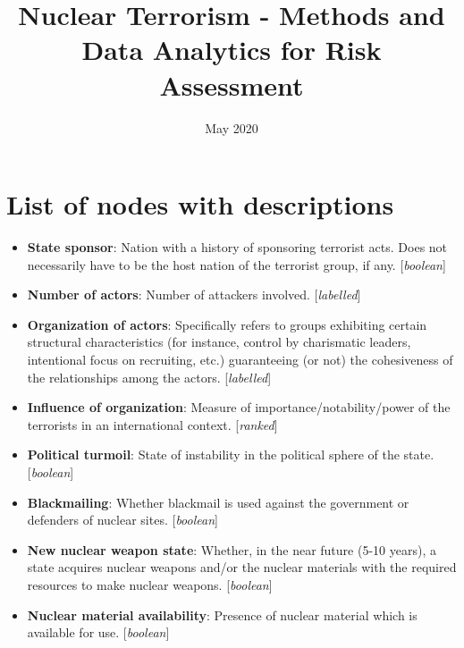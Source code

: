 \documentclass{article}
\title{Nuclear Terrorism - Methods and Data Analytics for Risk Assessment}
\date{May 2020}
\begin{document}
{\footnotesize
\section{List of nodes with descriptions}
\begin{itemize}
    \item \textbf{State sponsor}: Nation with a history of sponsoring terrorist acts. Does not necessarily have to be the host nation of the terrorist group, if any. [\textit{boolean}]

    \item \textbf{Number of actors}: Number of attackers involved. [\textit{labelled}] 

    \item \textbf{Organization of actors}: Specifically refers to groups exhibiting certain structural characteristics (for instance, control by charismatic leaders, intentional focus on recruiting, etc.) guaranteeing (or not) the cohesiveness of the relationships among the actors. [\textit{labelled}]

    \item \textbf{Influence of organization}:  Measure of importance/notability/power of the terrorists in an international context. [\textit{ranked}] 

    \item \textbf{Political turmoil}: State of instability in the political sphere of the state. [\textit{boolean}]

    \item \textbf{Blackmailing}: Whether blackmail is used against the government or defenders of nuclear sites. [\textit{boolean}]

    \item \textbf{New nuclear weapon state}: Whether, in the near future (5-10 years), a state acquires nuclear weapons and/or the nuclear materials with the required resources to make nuclear weapons. [\textit{boolean}]

    \item \textbf{Nuclear material availability}: Presence of nuclear material which is available for use. [\textit{boolean}]


\end{itemize}}
\end{document}
